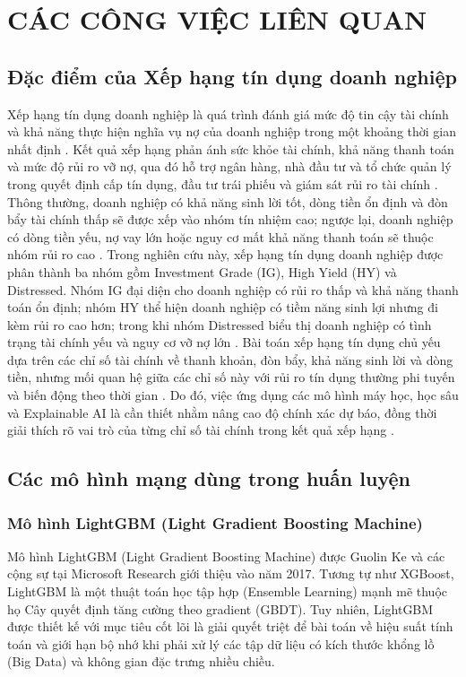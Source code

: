 \documentclass[10pt,twoside]{article}
\begin{document}
\section{CÁC CÔNG VIỆC LIÊN QUAN}

\subsection{Đặc điểm của Xếp hạng tín dụng doanh nghiệp}

Xếp hạng tín dụng doanh nghiệp là quá trình đánh giá mức độ tin cậy tài chính và khả năng thực hiện nghĩa vụ nợ của doanh nghiệp trong một khoảng thời gian nhất định \cite{phu_nghi_nodate}. Kết quả xếp hạng phản ánh sức khỏe tài chính, khả năng thanh toán và mức độ rủi ro vỡ nợ, qua đó hỗ trợ ngân hàng, nhà đầu tư và tổ chức quản lý trong quyết định cấp tín dụng, đầu tư trái phiếu và giám sát rủi ro tài chính \cite{hai_mo_2023}. Thông thường, doanh nghiệp có khả năng sinh lời tốt, dòng tiền ổn định và đòn bẩy tài chính thấp sẽ được xếp vào nhóm tín nhiệm cao; ngược lại, doanh nghiệp có dòng tiền yếu, nợ vay lớn hoặc nguy cơ mất khả năng thanh toán sẽ thuộc nhóm rủi ro cao \cite{thuy_ung_2023}. Trong nghiên cứu này, xếp hạng tín dụng doanh nghiệp được phân thành ba nhóm gồm Investment Grade (IG), High Yield (HY) và Distressed. Nhóm IG đại diện cho doanh nghiệp có rủi ro thấp và khả năng thanh toán ổn định; nhóm HY thể hiện doanh nghiệp có tiềm năng sinh lợi nhưng đi kèm rủi ro cao hơn; trong khi nhóm Distressed biểu thị doanh nghiệp có tình trạng tài chính yếu và nguy cơ vỡ nợ lớn \cite{hung_xep_2023}. Bài toán xếp hạng tín dụng chủ yếu dựa trên các chỉ số tài chính về thanh khoản, đòn bẩy, khả năng sinh lời và dòng tiền, nhưng mối quan hệ giữa các chỉ số này với rủi ro tín dụng thường phi tuyến và biến động theo thời gian \cite{hai_mo_2023}. Do đó, việc ứng dụng các mô hình máy học, học sâu và Explainable AI là cần thiết nhằm nâng cao độ chính xác dự báo, đồng thời giải thích rõ vai trò của từng chỉ số tài chính trong kết quả xếp hạng \cite{gramegna_shap_2021}.
\subsection{Các mô hình mạng dùng trong huấn luyện}

\subsubsection{Mô hình LightGBM (Light Gradient Boosting Machine)}
Mô hình LightGBM (Light Gradient Boosting Machine) \cite{ke_lightgbm_2017} được Guolin Ke và các cộng sự tại Microsoft Research giới thiệu vào năm 2017. Tương tự như XGBoost, LightGBM là một thuật toán học tập hợp (Ensemble Learning) mạnh mẽ thuộc họ Cây quyết định tăng cường theo gradient (GBDT). Tuy nhiên, LightGBM được thiết kế với mục tiêu cốt lõi là giải quyết triệt để bài toán về hiệu suất tính toán và giới hạn bộ nhớ khi phải xử lý các tập dữ liệu có kích thước khổng lồ (Big Data) và không gian đặc trưng nhiều chiều.
\end{document}
